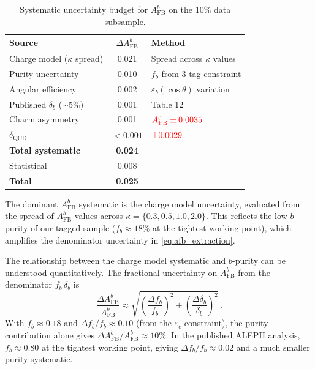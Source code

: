 \documentclass[11pt,a4paper]{article}
\newcommand{\external}[1]{\textcolor{red}{#1}}
\begin{document}
\begin{table}[htbp]
\centering
\caption{Systematic uncertainty budget for $A_\text{FB}^b$ on
the 10\% data subsample.}
\label{tbl:syst_afb}
\begin{tabular}{lcl}
\toprule
Source & $\Delta A_\text{FB}^b$ & Method \\
\midrule
Charge model ($\kappa$ spread) & 0.021 & Spread across $\kappa$ values \\
Purity uncertainty & 0.010 & $f_b$ from 3-tag constraint \\
Angular efficiency & 0.002 & $\varepsilon_b(\cos\theta)$ variation \\
Published $\delta_b$ ($\sim$5\%) & 0.001 & \cite{LEP:EWWG:2005} Table 12 \\
Charm asymmetry & 0.001 & $\external{A_\text{FB}^c \pm 0.0035}$ \\
$\delta_\text{QCD}$ & $< 0.001$ & $\external{\pm 0.0029}$~\cite{LEP:EWWG:2005} \\
\midrule
\textbf{Total systematic} & \textbf{0.024} & \\
Statistical & 0.008 & \\
\textbf{Total} & \textbf{0.025} & \\
\bottomrule
\end{tabular}
\end{table}

The dominant $A_\text{FB}^b$ systematic is the charge model
uncertainty, evaluated from the spread of $A_\text{FB}^b$ values
across $\kappa = \{0.3, 0.5, 1.0, 2.0\}$.
This reflects the low $b$-purity of our tagged sample
($f_b \approx 18\%$ at the tightest working point), which
amplifies the denominator uncertainty in
\cref{eq:afb_extraction}.

The relationship between the charge model systematic and $b$-purity
can be understood quantitatively.
The fractional uncertainty on $A_\text{FB}^b$ from the denominator
$f_b\,\delta_b$ is
\begin{equation}
\frac{\Delta A_\text{FB}^b}{A_\text{FB}^b} \approx
\sqrt{\left(\frac{\Delta f_b}{f_b}\right)^2 +
      \left(\frac{\Delta \delta_b}{\delta_b}\right)^2}\,.
\label{eq:afb_frac_unc}
\end{equation}
With $f_b \approx 0.18$ and $\Delta f_b / f_b \approx 0.10$
(from the $\varepsilon_c$ constraint), the purity contribution
alone gives $\Delta A_\text{FB}^b / A_\text{FB}^b \approx 10\%$.
In the published ALEPH analysis, $f_b \approx 0.80$ at the
tightest working point, giving $\Delta f_b / f_b \approx 0.02$
and a much smaller purity systematic.
\end{document}

